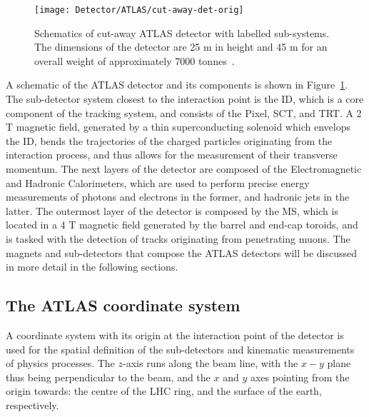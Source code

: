 	\begin{figure}[!hbt]
\centering
\texttt{[image: Detector/ATLAS/cut-away-det-orig]}
\setlength{\belowcaptionskip}{-20pt}
\caption{Schematics of cut-away \ac{ATLAS} detector with labelled sub-systems. The dimensions of the detector are 25 m in height and 45 m for an overall weight of approximately 7000 tonnes~\cite{Lefevre2008}.}
\label{fig:ATLAS}
\end{figure}
	A schematic of the \ac{ATLAS} detector and its components is shown in Figure~\ref{fig:ATLAS}. 
	The sub-detector system closest to the interaction point is the \ac{ID}, which is a core component of the tracking system, and consists of the \ac{Pixel}, \ac{SCT}, and \ac{TRT}. 
	A 2 T magnetic field, generated by a thin superconducting solenoid which envelops the \ac{ID}, bends the trajectories of the charged particles originating from the interaction process, and thus allows for the measurement of their transverse momentum.
	The next layers of the detector are composed of the Electromagnetic and Hadronic Calorimeters, which are used to perform precise energy measurements of photons and electrons in the former, and hadronic jets in the latter. The outermost layer of the detector is composed by the \ac{MS}, which is located in a 4 T magnetic field generated by the barrel and end-cap toroids, and is tasked with the detection of tracks originating from penetrating muons. The magnets and sub-detectors that compose the \ac{ATLAS} detectors will be discussed in more detail in the following sections.  
	\subsection*{The ATLAS coordinate system}
	\label{subsec:coord}
	A coordinate system with its origin at the interaction point of the detector is used for the spatial definition of the sub-detectors and kinematic measurements of physics processes.
	The $z$-axis runs along the beam line, with the $x-y$ plane thus being perpendicular to the beam, and the $x$ and $y$ axes pointing from the origin towards: the centre of the \ac{LHC} ring, and the surface of the earth, respectively.
	
